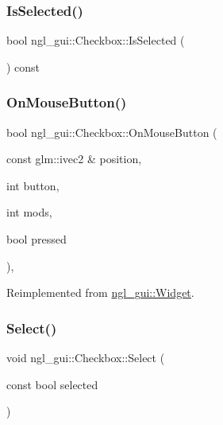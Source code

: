 \subsubsection{\texorpdfstring{Is\+Selected()}{IsSelected()}}
{\footnotesize\ttfamily bool ngl\+\_\+gui\+::\+Checkbox\+::\+Is\+Selected (\begin{DoxyParamCaption}{ }\end{DoxyParamCaption}) const}

\mbox{\label{classngl__gui_1_1_checkbox_a2616e2e230decef2a526e6fcfd59809e}} 
\subsubsection{\texorpdfstring{On\+Mouse\+Button()}{OnMouseButton()}}
{\footnotesize\ttfamily bool ngl\+\_\+gui\+::\+Checkbox\+::\+On\+Mouse\+Button (\begin{DoxyParamCaption}\item[{const glm\+::ivec2 \&}]{position,  }\item[{int}]{button,  }\item[{int}]{mods,  }\item[{bool}]{pressed }\end{DoxyParamCaption})\hspace{0.3cm}{\ttfamily [override]}, {\ttfamily [virtual]}}



Reimplemented from \mbox{\hyperlink{classngl__gui_1_1_widget_a721b18dc7a09b0b7b4ff0c02162409b8}{ngl\+\_\+gui\+::\+Widget}}.

\mbox{\label{classngl__gui_1_1_checkbox_aa8045bf06c7121724c86083e5e5b166c}} 
\subsubsection{\texorpdfstring{Select()}{Select()}}
{\footnotesize\ttfamily void ngl\+\_\+gui\+::\+Checkbox\+::\+Select (\begin{DoxyParamCaption}\item[{const bool}]{selected }\end{DoxyParamCaption})\hspace{0.3cm}{\ttfamily [virtual]}}

